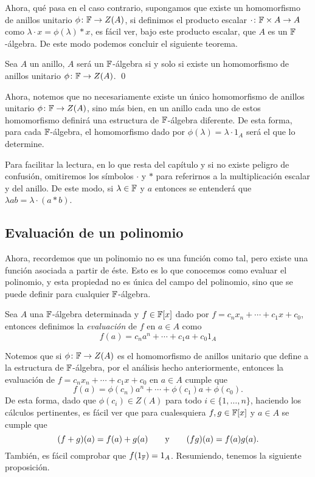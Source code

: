 Ahora, qué pasa en el caso contrario, supongamos que existe un homomorfismo de anillos unitario $\phi\colon \mathbb{F} \to Z(A)$, si definimos el producto escalar $\cdot \colon \mathbb{F}\times A \to A$ como $\lambda \cdot x = \phi(\lambda) * x$, es fácil ver, bajo este producto escalar, que $A$ es un $\mathbb{F}$-álgebra. De este modo podemos concluir el siguiente teorema.

\begin{teor}
  Sea $A$ un anillo, $A$ será un $\mathbb{F}$-álgebra si y solo si existe un homomorfismo de anillos unitario $\phi\colon \mathbb{F} \to Z(A)$. \qed
\end{teor}

Ahora, notemos que no necesariamente existe un único homomorfismo de anillos unitario $\phi\colon\mathbb{F}\to Z(A)$, sino más bien, en un anillo cada uno de estos homomorfismo definirá una estructura de $\mathbb{F}$-álgebra diferente. De esta forma, para cada $\mathbb{F}$-álgebra, el homomorfismo dado por $\phi(\lambda) = \lambda \cdot 1_A$ será el que lo determine.

Para facilitar la lectura, en lo que resta del capítulo y si no existe peligro de confusión, omitiremos los símbolos $\cdot$ y $*$ para referirnos a la multiplicación escalar y del anillo. De este modo, si $\lambda \in \mathbb{F}$ y $a$ entonces se entenderá que $\lambda a b = \lambda \cdot (a * b) $.



\subsection{Evaluación de un polinomio}

Ahora, recordemos que un polinomio no es una función como tal, pero existe una función asociada a partir de éste. Esto es lo que conocemos como evaluar el polinomio, y esta propiedad no es única del campo del polinomio, sino que se puede definir para cualquier $\mathbb{F}$-álgebra.

\begin{defi}
  Sea $A$ una $\mathbb{F}$-álgebra determinada y $f \in \mathbb{F}[x]$ dado por $f = c_n x_n + \cdots+ c_1x + c_0$, entonces definimos la \emph{evaluación} de $f$ en $a \in A$ como
  \[
    f(a) = c_n a^n + \cdots + c_1 a + c_0 1_A
  \]
\end{defi}

Notemos que si $\phi\colon \mathbb{F}\to Z(A)$ es el homomorfismo de anillos unitario que define a la estructura de $\mathbb{F}$-álgebra, por el análisis hecho anteriormente, entonces la evaluación de $f = c_n x_n + \cdots+ c_1x + c_0$ en $a \in A$ cumple que
  \[
    f(a) = \phi(c_n) a^n + \cdots + \phi(c_1) a + \phi(c_0).
  \]
De esta forma, dado que $\phi(c_i) \in Z(A)$ para todo $i \in \{1,\ldots, n\}$, haciendo los cálculos pertinentes, es fácil ver que para cualesquiera $f, g \in \mathbb{F}[x]$ y $a \in A$ se cumple que
\[
  (f+g)(a) = f(a) + g(a)
    \qquad\text{y}\qquad
  (fg)(a) = f(a) g(a).
\]
También, es fácil  comprobar que $f(1_{\mathbb{F}}) = 1_A$. Resumiendo, tenemos la siguiente proposición.

